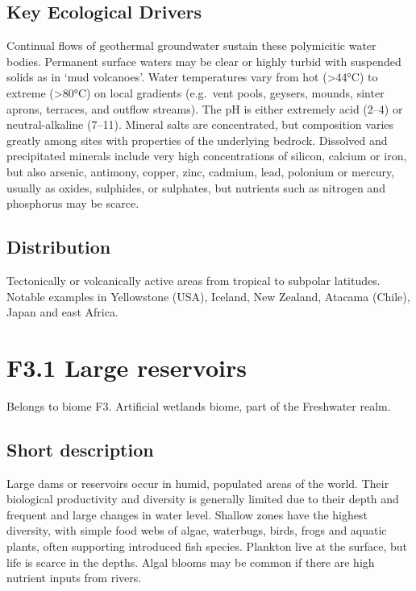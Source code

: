 \documentclass[
  letterpaper,
  DIV=11,
  numbers=noendperiod]{scrartcl}
\begin{document}
\subsection{Key Ecological Drivers}\label{key-ecological-drivers-16}

Continual flows of geothermal groundwater sustain these polymicitic
water bodies. Permanent surface waters may be clear or highly turbid
with suspended solids as in `mud volcanoes'. Water temperatures vary
from hot (\textgreater44°C) to extreme (\textgreater80°C) on local
gradients (e.g.~vent pools, geysers, mounds, sinter aprons, terraces,
and outflow streams). The pH is either extremely acid (2--4) or
neutral-alkaline (7--11). Mineral salts are concentrated, but
composition varies greatly among sites with properties of the underlying
bedrock. Dissolved and precipitated minerals include very high
concentrations of silicon, calcium or iron, but also arsenic, antimony,
copper, zinc, cadmium, lead, polonium or mercury, usually as oxides,
sulphides, or sulphates, but nutrients such as nitrogen and phosphorus
may be scarce.

\subsection{Distribution}\label{distribution-16}

Tectonically or volcanically active areas from tropical to subpolar
latitudes. Notable examples in Yellowstone (USA), Iceland, New Zealand,
Atacama (Chile), Japan and east Africa.

\section{F3.1 Large reservoirs}\label{f3.1-large-reservoirs}

Belongs to biome F3. Artificial wetlands biome, part of the Freshwater
realm.

\subsection{Short description}\label{short-description-17}

Large dams or reservoirs occur in humid, populated areas of the world.
Their biological productivity and diversity is generally limited due to
their depth and frequent and large changes in water level. Shallow zones
have the highest diversity, with simple food webs of algae, waterbugs,
birds, frogs and aquatic plants, often supporting introduced fish
species. Plankton live at the surface, but life is scarce in the depths.
Algal blooms may be common if there are high nutrient inputs from
rivers.
\end{document}
